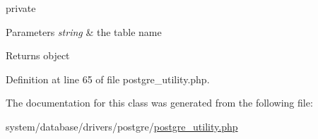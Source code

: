 private 
\begin{DoxyParams}{Parameters}
{\em string} & the table name \\
\hline
\end{DoxyParams}
\begin{DoxyReturn}{Returns}
object 
\end{DoxyReturn}


Definition at line 65 of file postgre\-\_\-utility.\-php.



The documentation for this class was generated from the following file\-:\begin{DoxyCompactItemize}
\item 
system/database/drivers/postgre/\hyperlink{postgre__utility_8php}{postgre\-\_\-utility.\-php}\end{DoxyCompactItemize}

